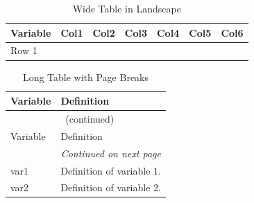 \begin{landscape}
\begin{table}[H]
    \centering
    \caption{Wide Table in Landscape}
    \label{tab:landscape}
    \begin{tabular}{lcccccc}
        \toprule
        Variable & Col1 & Col2 & Col3 & Col4 & Col5 & Col6 \\
        \midrule
        Row 1    & & & & & & \\
        \bottomrule
    \end{tabular}
\end{table}
\end{landscape}


\begin{longtable}{p{}p{}}
    \caption{Long Table with Page Breaks} \label{tab:long} \\
    \toprule
    Variable & Definition \\
    \midrule
    \endfirsthead                           %
    \multicolumn{2}{c}{\tablename~\thetable{} (continued)} \\
    \toprule
    Variable & Definition \\
    \midrule
    \endhead
    \midrule
    \multicolumn{2}{r}{\textit{Continued on next page}} \\
    \endfoot
    \bottomrule
    \endlastfoot
    var1 & Definition of variable 1. \\
    var2 & Definition of variable 2. \\
\end{longtable}

%
%


